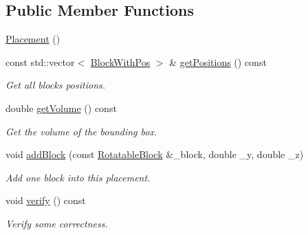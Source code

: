 \subsection*{Public Member Functions}
\begin{DoxyCompactItemize}
\item 
\hyperlink{classPlacement_aa0020a3dd0bedb34998968adfacf8a4e}{Placement} ()
\item 
const std\+::vector$<$ \hyperlink{structPlacement_1_1BlockWithPos}{Block\+With\+Pos} $>$ \& \hyperlink{classPlacement_a8d2aff015fbf652bbccae2db6c7dd7d9}{get\+Positions} () const 
\begin{DoxyCompactList}\small\item\em Get all blocks\textquotesingle{} positions. \end{DoxyCompactList}\item 
double \hyperlink{classPlacement_a686b1f2aa26ae12285a5759d1b6e5f67}{get\+Volume} () const 
\begin{DoxyCompactList}\small\item\em Get the volume of the bounding box. \end{DoxyCompactList}\item 
void \hyperlink{classPlacement_a21dc44cf496d771e5c2ac17a24ac1703}{add\+Block} (const \hyperlink{structRotatableBlock}{Rotatable\+Block} \&\+\_\+block, double \+\_\+y, double \+\_\+z)
\begin{DoxyCompactList}\small\item\em Add one block into this placement. \end{DoxyCompactList}\item 
void \hyperlink{classPlacement_a7e54624dff8703581efc6be7d1af991e}{verify} () const 
\begin{DoxyCompactList}\small\item\em Verify some correctness. \end{DoxyCompactList}\end{DoxyCompactItemize}
